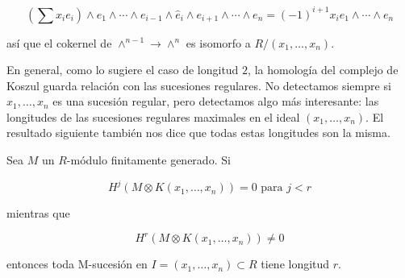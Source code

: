 $$ \left(\sum x_ie_i\right)\wedge e_1\wedge\cdots\wedge e_{i-1}\wedge \hat{e}_i\wedge e_{i+1}\wedge\cdots\wedge e_n = (-1)^{i+1}x_ie_1\wedge\cdots\wedge e_n$$

así que el cokernel de $\wedge^{n-1} \rightarrow \wedge^n$ es isomorfo a $R/(x_1,\dots,x_n)$.

En general, como lo sugiere el caso de longitud $2$, la homología del complejo de Koszul guarda relación con las sucesiones regulares. No detectamos siempre si $x_1, \dots, x_n$ es una sucesión regular, pero detectamos algo más interesante: las longitudes de las sucesiones regulares maximales en el ideal $(x_1, \dots, x_n)$. El resultado siguiente también nos dice que todas estas longitudes son la misma.

\begin{theorem}
Sea $M$ un $R$-módulo finitamente generado. Si

$$ H^j(M\otimes K(x_1,\dots,x_n)) = 0 \textrm{ para } j < r $$

mientras que

$$ H^r(M\otimes K(x_1,\dots,x_n)) \neq 0 $$

entonces toda M-sucesión en $I = (x_1,\dots, x_n) \subset R$ tiene longitud $r$.
\end{theorem}